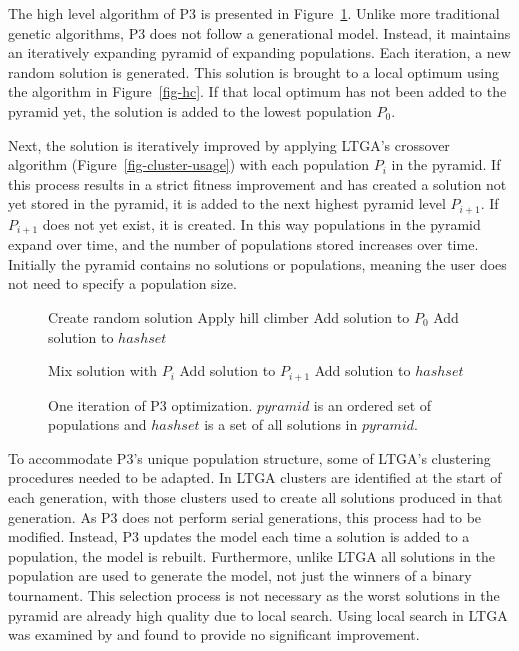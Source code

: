 \documentclass[twoside]{article}
\begin{document}
The high level algorithm of P3 is presented in Figure~\ref{fig-p3}. Unlike more traditional
genetic algorithms, P3 does not follow a generational model. Instead, it maintains an iteratively
expanding pyramid of expanding populations. Each iteration, a new random solution is generated.
This solution is brought to a local optimum using the algorithm in Figure~\ref{fig-hc}. If that
local optimum has not been added to the pyramid yet, the solution is added to the lowest
population $P_0$.

Next, the solution is iteratively improved by applying LTGA's crossover algorithm (Figure~\ref{fig-cluster-usage})
with each population $P_i$ in the pyramid. If this process results in a strict fitness improvement and has
created a solution not yet stored in the pyramid, it is added to the next highest pyramid level $P_{i+1}$.
If $P_{i+1}$ does not yet exist, it is created. In this way populations in the pyramid expand over time,
and the number of populations stored increases over time. Initially the pyramid contains no solutions
or populations, meaning the user does not need to specify a population size.


\begin{figure}
  \begin{algorithmic}[1]
    \State Create random solution
    \State Apply hill climber
      \State Add solution to $P_0$
      \State Add solution to $hashset$
    \EndIf

      \State Mix solution with $P_i$
          \State Add solution to $P_{i+1}$
          \State Add solution to $hashset$
        \EndIf
      \EndIf
    \EndFor
  \EndProcedure
\end{algorithmic}
  \caption{One iteration of P3 optimization. $pyramid$ is an
           ordered set of populations and $hashset$ is a set
           of all solutions in $pyramid$.}
  \label{fig-p3}
\end{figure}

To accommodate P3's unique population structure, some of LTGA's clustering procedures needed
to be adapted. In LTGA
clusters are identified at the start of each generation, with those clusters used
to create all solutions produced in that generation. As P3 does not perform serial
generations, this process had to be modified. Instead, P3 updates the model each
time a solution is added to a population, the model is rebuilt. Furthermore, unlike
LTGA all solutions in the population are used to generate the model, not just the
winners of a binary tournament. This selection process is not necessary as the
worst solutions in the pyramid are already high quality due to local search.
Using local search in LTGA was examined by \cite{bosman:2011:lsbbo} and found
to provide no significant improvement.
\end{document}
